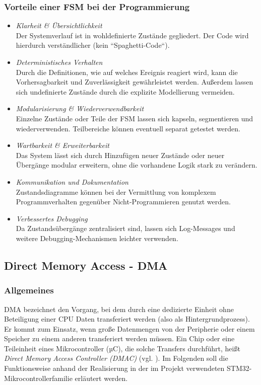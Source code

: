 \documentclass[a4paper, portrait, 12pt]{scrartcl} %
\begin{document}
\subsubsection{Vorteile einer FSM bei der Programmierung}
\begin{itemize}
	\item \emph{Klarheit \& Übersichtlichkeit}\\
	Der Systemverlauf ist in wohldefinierte Zustände gegliedert. Der Code wird hierdurch verständlicher (kein ``Spaghetti-Code``).
	\item \emph{Deterministisches Verhalten}\\
	Durch die Definitionen, wie auf welches Ereignis reagiert wird, kann die Vorhersagbarkeit und Zuverlässigkeit gewährleistet werden. Außerdem lassen sich undefinierte Zustände durch die explizite Modellierung vermeiden.
	\item \emph{Modularisierung \& Wiederverwendbarkeit}\\
	Einzelne Zustände oder Teile der FSM lassen sich kapseln, segmentieren und wiederverwenden. Teilbereiche können eventuell separat getestet werden.
	\item \emph{Wartbarkeit \& Erweiterbarkeit}\\
	Das System lässt sich durch Hinzufügen neuer Zustände oder neuer Übergänge modular erweitern, ohne die vorhandene Logik stark zu verändern.
	\item \emph{Kommunikation und Dokumentation}\\
	Zustandsdiagramme können bei der Vermittlung von komplexem Programmverhalten gegenüber Nicht-Programmieren genutzt werden.
	\item \emph{Verbessertes Debugging}\\
	Da Zustandsübergänge zentralisiert sind, lassen sich Log-Messages und weitere Debugging-Mechanismen leichter verwenden.
\end{itemize}

\subsection{Direct Memory Access - DMA}
\label{subsec:dma}
\subsubsection{Allgemeines}
DMA bezeichnet den Vorgang, bei dem durch eine dedizierte Einheit ohne Beteiligung einer CPU Daten transferiert werden (also als Hintergrundprozess). Er kommt zum Einsatz, wenn große Datenmengen von der Peripherie oder einem Speicher zu einem anderen transferiert werden müssen. Ein Chip oder eine Teileinheit eines Mikrocontroller (µC), die solche Transfers durchführt, heißt \emph{Direct Memory Access Controller (DMAC)} (vgl. \cite[S. 125]{Urbanek2020}). Im Folgenden soll die Funktionsweise anhand der Realisierung in der im Projekt verwendeten STM32-Mikrocontrollerfamilie erläutert werden.
\end{document}
